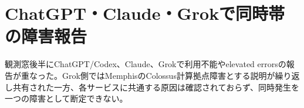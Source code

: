 \section{ChatGPT・Claude・Grokで同時帯の障害報告}

観測窓後半にChatGPT/Codex、Claude、Grokで利用不能やelevated errorsの報告が重なった。Grok側ではMemphisのColossus計算拠点障害とする説明が繰り返し共有された一方、各サービスに共通する原因は確認されておらず、同時発生を一つの障害として断定できない。


